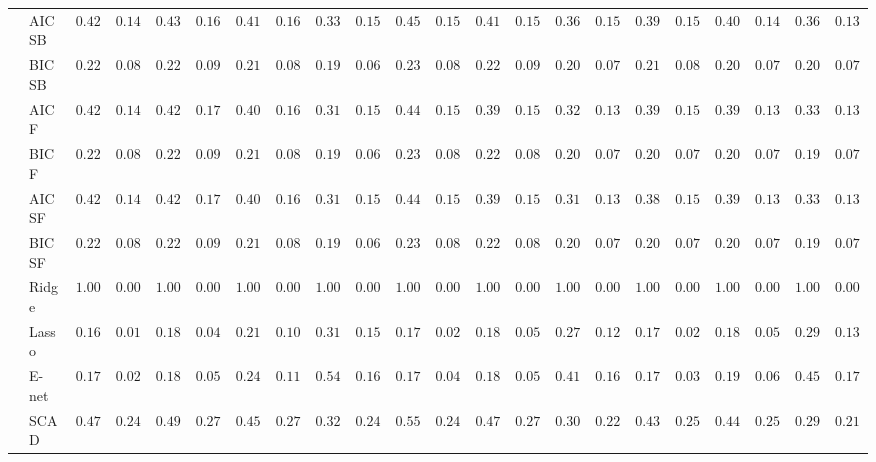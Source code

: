 \begin{tabular}{ll|ll|llllll|llllll|llllll}
 & AIC SB  & $0.4233$ & $0.1449$ & $0.4333$ & $0.1692$ & $0.4100$ & $0.1648$ & $0.3367$ & $0.1589$ & $0.4500$ & $0.1562$ & $0.4133$ & $0.1598$ & $0.3633$ & $0.1560$ & $0.3900$ & $0.1539$ & $0.4033$ & $0.1444$ & $0.3600$ & $0.1355$ \\
 & BIC SB  & $0.2200$ & $0.0816$ & $0.2233$ & $0.0954$ & $0.2150$ & $0.0896$ & $0.1983$ & $0.0699$ & $0.2367$ & $0.0860$ & $0.2250$ & $0.0929$ & $0.2017$ & $0.0760$ & $0.2117$ & $0.0882$ & $0.2050$ & $0.0744$ & $0.2000$ & $0.0749$ \\
 & AIC F  & $0.4233$ & $0.1449$ & $0.4217$ & $0.1732$ & $0.4017$ & $0.1626$ & $0.3167$ & $0.1508$ & $0.4483$ & $0.1548$ & $0.3900$ & $0.1557$ & $0.3217$ & $0.1386$ & $0.3900$ & $0.1575$ & $0.3950$ & $0.1374$ & $0.3317$ & $0.1350$ \\
 & BIC F  & $0.2200$ & $0.0816$ & $0.2233$ & $0.0954$ & $0.2100$ & $0.0842$ & $0.1983$ & $0.0699$ & $0.2367$ & $0.0860$ & $0.2217$ & $0.0888$ & $0.2050$ & $0.0744$ & $0.2083$ & $0.0763$ & $0.2017$ & $0.0722$ & $0.1983$ & $0.0738$ \\
 & AIC SF  & $0.4233$ & $0.1449$ & $0.4217$ & $0.1732$ & $0.4017$ & $0.1626$ & $0.3167$ & $0.1508$ & $0.4483$ & $0.1548$ & $0.3900$ & $0.1557$ & $0.3167$ & $0.1350$ & $0.3883$ & $0.1536$ & $0.3950$ & $0.1374$ & $0.3317$ & $0.1350$ \\
 & BIC SF  & $0.2200$ & $0.0816$ & $0.2233$ & $0.0954$ & $0.2100$ & $0.0842$ & $0.1983$ & $0.0699$ & $0.2367$ & $0.0860$ & $0.2217$ & $0.0888$ & $0.2050$ & $0.0744$ & $0.2083$ & $0.0763$ & $0.2017$ & $0.0722$ & $0.1983$ & $0.0738$ \\
 & Ridge  & $1.0000$ & $0.0000$ & $1.0000$ & $0.0000$ & $1.0000$ & $0.0000$ & $1.0000$ & $0.0000$ & $1.0000$ & $0.0000$ & $1.0000$ & $0.0000$ & $1.0000$ & $0.0000$ & $1.0000$ & $0.0000$ & $1.0000$ & $0.0000$ & $1.0000$ & $0.0000$ \\
 & Lasso  & $0.1683$ & $0.0167$ & $0.1817$ & $0.0479$ & $0.2133$ & $0.1035$ & $0.3167$ & $0.1544$ & $0.1717$ & $0.0286$ & $0.1850$ & $0.0575$ & $0.2783$ & $0.1232$ & $0.1700$ & $0.0235$ & $0.1833$ & $0.0556$ & $0.2917$ & $0.1348$ \\
 & E-net  & $0.1700$ & $0.0235$ & $0.1833$ & $0.0503$ & $0.2400$ & $0.1192$ & $0.5433$ & $0.1635$ & $0.1733$ & $0.0405$ & $0.1867$ & $0.0594$ & $0.4133$ & $0.1632$ & $0.1733$ & $0.0328$ & $0.1917$ & $0.0686$ & $0.4517$ & $0.1729$ \\
 & SCAD  & $0.4700$ & $0.2455$ & $0.4933$ & $0.2710$ & $0.4517$ & $0.2725$ & $0.3267$ & $0.2461$ & $0.5567$ & $0.2418$ & $0.4733$ & $0.2790$ & $0.3017$ & $0.2206$ & $0.4367$ & $0.2538$ & $0.4400$ & $0.2590$ & $0.2933$ & $0.2134$ \\

\end{tabular}
